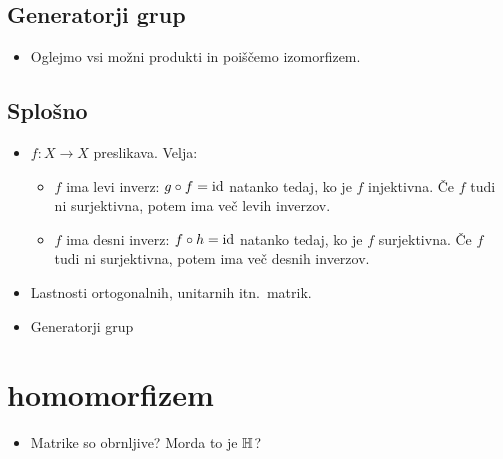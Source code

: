 \subsection{Generatorji grup}
\begin{itemize}
    \item Oglejmo vsi možni produkti in poiščemo izomorfizem.
\end{itemize}

\subsection{Splošno}
\begin{itemize}
    \item \(f: X \to X\) preslikava. Velja:
    \begin{itemize}
        \item \(f\) ima levi inverz: \(g \circ f = \operatorname{id}\) natanko tedaj, ko je \(f\) injektivna. Če \(f\) tudi ni surjektivna, potem ima več levih inverzov.
        \item \(f\) ima desni inverz: \(f \circ h = \operatorname{id}\) natanko tedaj, ko je \(f\) surjektivna. Če \(f\) tudi ni surjektivna, potem ima več desnih inverzov.
    \end{itemize}
    \item Lastnosti ortogonalnih, unitarnih itn.\ matrik.
    \item Generatorji grup
\end{itemize}

\section{homomorfizem}
\begin{itemize}
    \item Matrike so obrnljive? Morda to je \(\mathbb{H}\)?
\end{itemize}